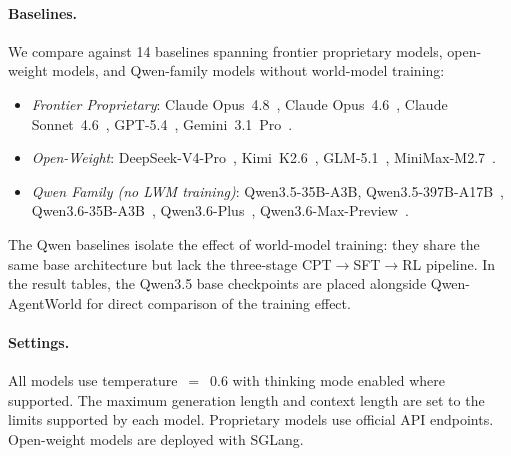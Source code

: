 \documentclass{llmxive}
\providecommand{\method}{Qwen-AgentWorld\xspace}
\begin{document}
\paragraph{Baselines.}
We compare against 14 baselines spanning frontier proprietary models, open-weight models, and Qwen-family models without world-model training:
\begin{itemize}[nosep,leftmargin=*]
  \item \textit{Frontier Proprietary}: Claude Opus~4.8~\citep{opus4.8}, Claude Opus~4.6~\citep{opus4.6}, Claude Sonnet~4.6~\citep{sonnet4.6}, GPT-5.4~\citep{gpt-5.4}, Gemini~3.1~Pro~\citep{gemini3.1pro}.
  \item \textit{Open-Weight}: DeepSeek-V4-Pro~\citep{deepseekai2026deepseekv4}, Kimi~K2.6~\citep{team2026kimi}, GLM-5.1~\citep{zeng2026glm}, MiniMax-M2.7~\citep{minimax2026minimax}.
  \item \textit{Qwen Family (no LWM training)}: Qwen3.5-35B-A3B, Qwen3.5-397B-A17B~\citep{qwen35blog}, Qwen3.6-35B-A3B~\citep{qwen36_35b_a3b}, Qwen3.6-Plus~\citep{qwen36plus}, Qwen3.6-Max-Preview~\citep{qwen36_max_preview}.
\end{itemize}
The Qwen baselines isolate the effect of world-model training: they share the same base architecture but lack the three-stage CPT$\to$SFT$\to$RL pipeline.
In the result tables, the Qwen3.5 base checkpoints are placed alongside \method for direct comparison of the training effect.

\paragraph{Settings.}
All models use temperature~$=$~0.6 with thinking mode enabled where supported.
The maximum generation length and context length are set to the limits supported by each model.
Proprietary models use official API endpoints.
Open-weight models are deployed with SGLang.
\end{document}
